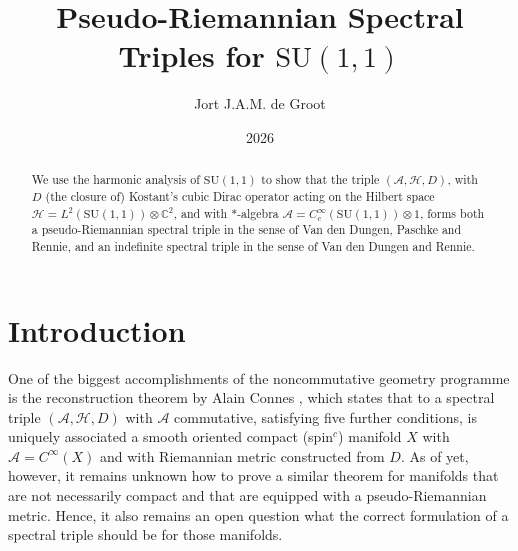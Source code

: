 \documentclass{amsart}
\theoremstyle{definition}
\theoremstyle{remark}
\numberwithin{equation}{section}
\begin{document}
\title{Pseudo-Riemannian Spectral Triples for $\mathrm{SU}(1,1)$}


\author{Jort J.A.M. de Groot}
\address{Korteweg–de Vries Institute voor Wiskunde, University of Amsterdam, Sciencepark 105-107, 1090
GE Amsterdam, The Netherlands}



\date{2026}

\dedicatory{}

\begin{abstract}
    We use the harmonic analysis of $\mathrm{SU}(1,1)$ to show that the triple $(\mathcal{A},\mathcal{H},D)$, with $D$ (the closure of) Kostant's cubic Dirac operator acting on the Hilbert space $\mathcal{H}=L^2(\mathrm{SU}(1,1))\otimes\mathbb{C}^2$, and with $*$-algebra $\mathcal{A}=C^\infty_c(\mathrm{SU}(1,1))\otimes 1$, forms both a pseudo-Riemannian spectral triple in the sense of Van den Dungen, Paschke and Rennie, and an indefinite spectral triple in the sense of Van den Dungen and Rennie.
\end{abstract}

\maketitle

\section{Introduction}
One of the biggest accomplishments of the noncommutative geometry programme is the reconstruction theorem by Alain Connes \cite{connes_2013}, which states that to a spectral triple $(\mathcal{A},\mathcal{H},D)$ with $\mathcal{A}$ commutative, satisfying five further conditions, is uniquely associated a smooth oriented compact (spin$^c$) manifold $X$ with $\mathcal{A}=C^\infty(X)$ and with Riemannian metric constructed from $D$. As of yet, however, it remains unknown how to prove a similar theorem for manifolds that are not necessarily compact and that are equipped with a pseudo-Riemannian metric. Hence, it also remains an open question what the correct formulation of a spectral triple should be for those manifolds. 
\end{document}
